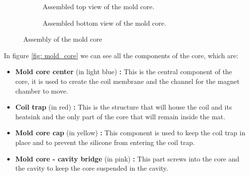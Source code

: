 \begin{itemize}
\begin{figure}
\begin{subfigure}[b]{0.475\textwidth}
{            }
            \caption{Assembled top view of the mold core.}
        \end{subfigure}
        \hfill
        \begin{subfigure}[b]{0.475\textwidth}
            \centering
            \caption{Assembled bottom view of the mold core.}
        \end{subfigure}
        \caption{Assembly of the mold core}
        \label{fig: mat_mold_core}
    \end{figure}
    In figure \ref{fig: mold_core} we can see all the components of the core, which are:
    \begin{itemize}
        \item \textbf{Mold core center } (in light blue) \textbf{: } This is the central component of the core, it is used to create the coil membrane and the channel for the magnet chamber to move.
        \item \textbf{Coil trap} (in red) \textbf{: } This is the structure that will house the coil and its heatsink and the only part of the core that will remain inside the mat.
        \item \textbf{Mold core cap } (in yellow) \textbf{: } This component is used to keep the coil trap in place and to prevent the silicone from entering the coil trap.
        \item \textbf{Mold core - cavity bridge } (in pink) \textbf{: } This part screws into the core and the cavity to keep the core suspended in the cavity.
    \end {itemize}
    
\end{itemize}

